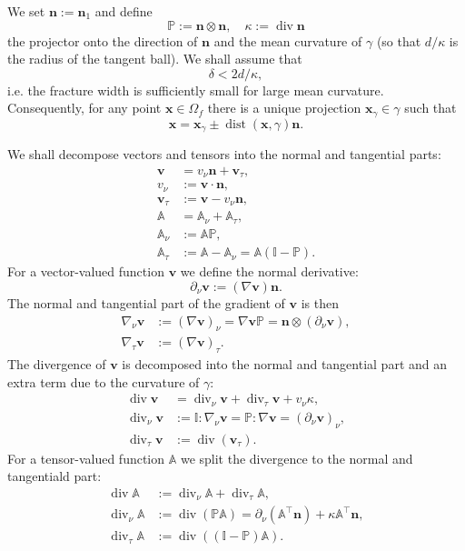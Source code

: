 \documentclass[a4paper]{article}
\def\prtl{\partial}
\def\vc#1{\mathbf{\boldsymbol{#1}}}     %
\def\tn#1{{\mathbb{#1}}}    %
\def\div{\operatorname{div}}
\def\dist{\operatorname{dist}}
\def\nn{\vc n}
\def\vv{\vc v}
\def\xx{\vc x}
\begin{document}
We set $\nn:=\nn_1$ and define
\[ \tn P := \nn\otimes\nn, \quad \kappa:=\div\nn \]
the projector onto the direction of $\nn$ and the mean curvature of $\gamma$ (so that $d/\kappa$ is the radius of the tangent ball).
We shall assume that
\[ \delta<2d/\kappa, \]
i.e. the fracture width is sufficiently small for large mean curvature.
Consequently, for any point $\xx\in\Omega_f$ there is a unique projection $\xx_\gamma\in\gamma$ such that
\[ \xx = \xx_\gamma \pm \dist(\xx,\gamma)\nn. \]

We shall decompose vectors and tensors into the normal and tangential parts:
\[ \begin{aligned}
\vv &= v_\nu\nn + \vv_\tau,\\
v_\nu &:= \vv\cdot\nn,\\
\vv_\tau &:= \vv-v_\nu\nn,\\
\tn A &= \tn A_\nu + \tn A_\tau,\\
\tn A_\nu &:= \tn A\tn P,\\
\tn A_\tau &:= \tn A-\tn A_\nu = \tn A(\tn I-\tn P).
\end{aligned} \]
For a vector-valued function $\vv$ we define the normal derivative:
\[ \prtl_\nu\vv := (\nabla\vv)\nn. \]
The normal and tangential part of the gradient of $\vv$ is then
\[ \begin{aligned}
\nabla_\nu\vv &:= (\nabla\vv)_\nu = \nabla\vv\tn P = \nn\otimes(\prtl_\nu\vv),\\
\nabla_\tau\vv &:= (\nabla\vv)_\tau.
\end{aligned} \]
The divergence of $\vv$ is decomposed into the normal and tangential part and an extra term due to the curvature of $\gamma$:
\begin{align}
\label{eq:div_v_split}\div\vv &= \div_\nu\vv + \div_\tau\vv + v_\nu\kappa,\\
\div_\nu\vv &:= \tn I:\nabla_\nu\vv = \tn P:\nabla\vv = (\prtl_\nu\vv)_\nu,\\
\div_\tau\vv &:= \div(\vv_\tau).
\end{align}
For a tensor-valued function $\tn A$ we split the divergence to the normal and tangentiald part:
\begin{subequations}
\label{eq:div_tn}
\begin{align}
\div\tn A &:= \div_\nu\tn A + \div_\tau\tn A,\\
\div_\nu\tn A &:= \div(\tn P\tn A)=\prtl_\nu(\tn A^\top\nn)+\kappa\tn A^\top\nn,\\
\div_\tau\tn A &:= \div((\tn I-\tn P)\tn A).
\end{align}
\end{subequations}
\end{document}

